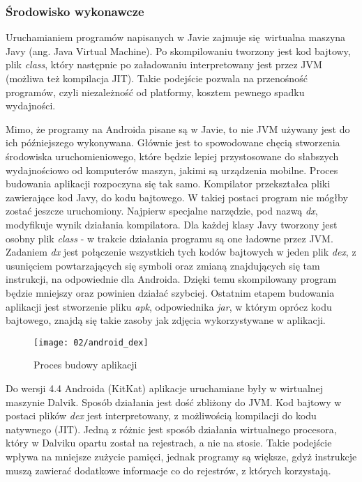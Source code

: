 \subsubsection*{Środowisko wykonawcze}
Uruchamianiem programów napisanych w Javie zajmuje się wirtualna maszyna Javy (ang. Java Virtual Machine). Po skompilowaniu tworzony jest kod bajtowy, plik \textit{class}, który następnie po załadowaniu interpretowany jest przez JVM (możliwa też kompilacja JIT). Takie podejście pozwala na przenośność programów, czyli niezależność od platformy, kosztem pewnego spadku wydajności.

Mimo, że programy na Androida pisane są w Javie, to nie JVM używany jest do ich późniejszego wykonywana. Głównie jest to spowodowane chęcią stworzenia środowiska uruchomieniowego, które będzie lepiej przystosowane do słabszych wydajnościowo od komputerów maszyn, jakimi są urządzenia mobilne. Proces budowania aplikacji rozpoczyna się tak samo. Kompilator przekształca pliki zawierające kod Javy, do kodu bajtowego. W takiej postaci program nie mógłby zostać jeszcze uruchomiony. Najpierw specjalne narzędzie, pod nazwą \textit{dx}, modyfikuje wynik działania kompilatora. Dla każdej klasy Javy tworzony jest osobny plik \textit{class} - w trakcie działania programu są one ładowne przez JVM. Zadaniem \textit{dx} jest połączenie wszystkich tych kodów bajtowych w jeden plik \textit{dex}, z usunięciem powtarzających się symboli oraz zmianą znajdujących się tam instrukcji, na odpowiednie dla Androida. Dzięki temu skompilowany program będzie mniejszy oraz powinien działać szybciej. Ostatnim etapem budowania aplikacji jest stworzenie pliku \textit{apk}, odpowiednika \textit{jar}, w którym oprócz kodu bajtowego, znajdą się takie zasoby jak zdjęcia wykorzystywane w aplikacji.
\begin{figure}[h]
	\begin{center}
		\texttt{[image: 02/android\_dex]}
	\end{center}
	\caption{Proces budowy aplikacji}
	\vspace{-0.5cm}
\end{figure}

Do wersji 4.4 Androida (KitKat) aplikacje uruchamiane były w wirtualnej maszynie Dalvik. Sposób działania jest dość zbliżony do JVM. Kod bajtowy w postaci plików \textit{dex} jest interpretowany, z możliwością kompilacji do kodu natywnego (JIT). Jedną z różnic jest sposób działania wirtualnego procesora, który w Dalviku opartu został na rejestrach, a nie na stosie. Takie podejście wpływa na mniejsze zużycie pamięci, jednak programy są większe, gdyż instrukcje muszą zawierać dodatkowe informacje co do rejestrów, z których korzystają.

